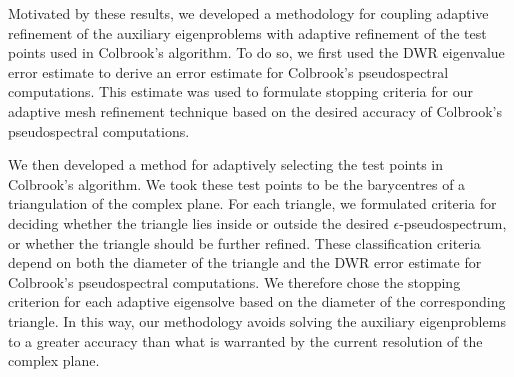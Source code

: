 
Motivated by these results, we developed a methodology for coupling adaptive refinement of the auxiliary eigenproblems with adaptive refinement of the test points used in Colbrook's algorithm. To do so, we first used the DWR eigenvalue error estimate to derive an error estimate for Colbrook's pseudospectral computations. This estimate was used to formulate stopping criteria for our adaptive mesh refinement technique based on the desired accuracy of Colbrook's pseudospectral computations.

We then developed a method for adaptively selecting the test points in Colbrook's algorithm. We took these test points to be the barycentres of a triangulation of the complex plane. For each triangle, we formulated criteria for deciding whether the triangle lies inside or outside the desired $\epsilon$-pseudospectrum, or whether the triangle should be further refined. These classification criteria depend on both the diameter of the triangle and the DWR error estimate for Colbrook's pseudospectral computations. We therefore chose the stopping criterion for each adaptive eigensolve based on the diameter of the corresponding triangle. In this way, our methodology avoids solving the auxiliary eigenproblems to a greater accuracy than what is warranted by the current resolution of the complex plane. 



